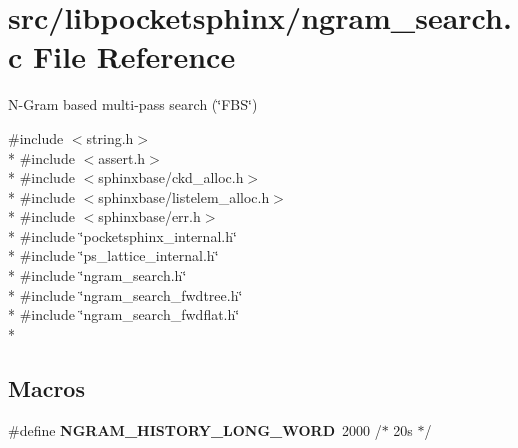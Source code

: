 \section{src/libpocketsphinx/ngram\+\_\+search.c File Reference}
\label{ngram__search_8c}


N-\/\+Gram based multi-\/pass search (\char`\"{}\+F\+B\+S\char`\"{})  


{\ttfamily \#include $<$string.\+h$>$}\\*
{\ttfamily \#include $<$assert.\+h$>$}\\*
{\ttfamily \#include $<$sphinxbase/ckd\+\_\+alloc.\+h$>$}\\*
{\ttfamily \#include $<$sphinxbase/listelem\+\_\+alloc.\+h$>$}\\*
{\ttfamily \#include $<$sphinxbase/err.\+h$>$}\\*
{\ttfamily \#include \char`\"{}pocketsphinx\+\_\+internal.\+h\char`\"{}}\\*
{\ttfamily \#include \char`\"{}ps\+\_\+lattice\+\_\+internal.\+h\char`\"{}}\\*
{\ttfamily \#include \char`\"{}ngram\+\_\+search.\+h\char`\"{}}\\*
{\ttfamily \#include \char`\"{}ngram\+\_\+search\+\_\+fwdtree.\+h\char`\"{}}\\*
{\ttfamily \#include \char`\"{}ngram\+\_\+search\+\_\+fwdflat.\+h\char`\"{}}\\*
\subsection*{Macros}
\begin{DoxyCompactItemize}
\item 
\#define {\bfseries N\+G\+R\+A\+M\+\_\+\+H\+I\+S\+T\+O\+R\+Y\+\_\+\+L\+O\+N\+G\+\_\+\+W\+O\+R\+D}~2000 /$\ast$ 20s $\ast$/\label{ngram__search_8c_af9ad6b3d4ef3ad501da8e2296b25a131}

\end{DoxyCompactItemize}
